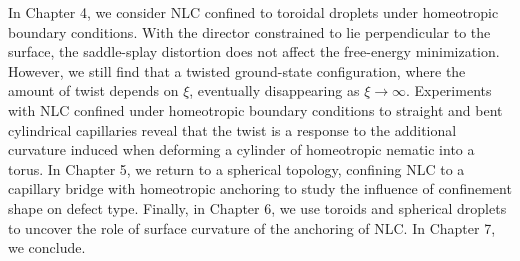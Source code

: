 In Chapter 4, we consider NLC confined to toroidal droplets under homeotropic boundary conditions.
With the director constrained to lie perpendicular to the surface, the saddle-splay distortion does not affect the free-energy minimization.
However, we still find that a twisted ground-state configuration, where the amount of twist depends on $\xi$, eventually disappearing as $\xi \rightarrow \infty$.
Experiments with NLC confined under homeotropic boundary conditions to straight and bent cylindrical capillaries reveal that the twist is a response to the additional curvature induced when deforming a cylinder of homeotropic nematic into a torus.
In Chapter 5, we return to a spherical topology, confining NLC to a capillary bridge with homeotropic anchoring to study the influence of confinement shape on defect type.
Finally, in Chapter 6, we use toroids and spherical droplets to uncover the role of surface curvature of the anchoring of NLC.
In Chapter 7, we conclude.
